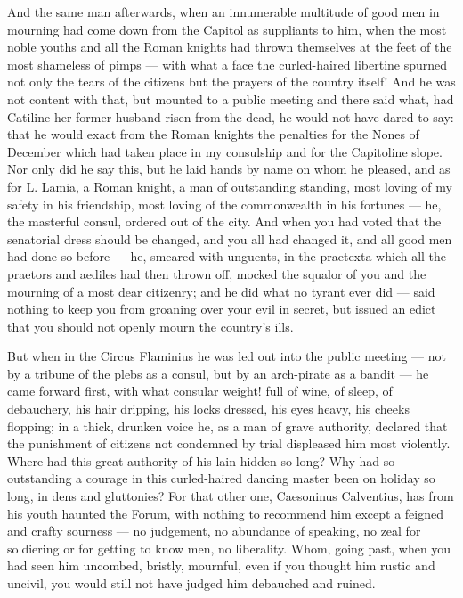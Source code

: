  And the same man afterwards, when an innumerable multitude of good men in mourning had come down from the Capitol as suppliants to him, when the most noble youths and all the Roman knights had thrown themselves at the feet of the most shameless of pimps --- with what a face the curled-haired libertine spurned not only the tears of the citizens but the prayers of the country itself! And he was not content with that, but mounted to a public meeting and there said what, had Catiline her former husband risen from the dead, he would not have dared to say: that he would exact from the Roman knights the penalties for the Nones of December which had taken place in my consulship and for the Capitoline slope. Nor only did he say this, but he laid hands by name on whom he pleased, and as for L. Lamia, a Roman knight, a man of outstanding standing, most loving of my safety in his friendship, most loving of the commonwealth in his fortunes --- he, the masterful consul, ordered out of the city. And when you had voted that the senatorial dress should be changed, and you all had changed it, and all good men had done so before --- he, smeared with unguents, in the praetexta which all the praetors and aediles had then thrown off, mocked the squalor of you and the mourning of a most dear citizenry; and he did what no tyrant ever did --- said nothing to keep you from groaning over your evil in secret, but issued an edict that you should not openly mourn the country's ills.

 But when in the Circus Flaminius he was led out into the public meeting --- not by a tribune of the plebs as a consul, but by an arch-pirate as a bandit --- he came forward first, with what consular weight! full of wine, of sleep, of debauchery, his hair dripping, his locks dressed, his eyes heavy, his cheeks flopping; in a thick, drunken voice he, as a man of grave authority, declared that the punishment of citizens not condemned by trial displeased him most violently. Where had this great authority of his lain hidden so long? Why had so outstanding a courage in this curled-haired dancing master been on holiday so long, in dens and gluttonies? For that other one, Caesoninus Calventius, has from his youth haunted the Forum, with nothing to recommend him except a feigned and crafty sourness --- no judgement, no abundance of speaking, no zeal for soldiering or for getting to know men, no liberality. Whom, going past, when you had seen him uncombed, bristly, mournful, even if you thought him rustic and uncivil, you would still not have judged him debauched and ruined.

